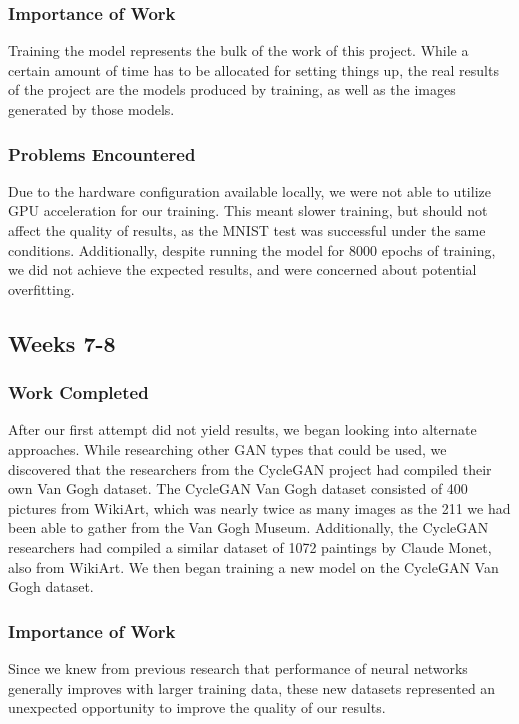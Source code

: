 \documentclass[11pt,letterpaper]{article}
\begin{document}
			\subsubsection{Importance of Work}
				Training the model represents the bulk of the work of this project.
				While a certain amount of time has to be allocated for setting things up, the real results of the project are the models produced by training, as well as the images generated by those models.
			\subsubsection{Problems Encountered}
				Due to the hardware configuration available locally, we were not able to utilize GPU acceleration for our training.
				This meant slower training, but should not affect the quality of results, as the MNIST test was successful under the same conditions.
				Additionally, despite running the model for 8000 epochs of training, we did not achieve the expected results, and were concerned about potential overfitting.

		\subsection{Weeks 7-8}
			\subsubsection{Work Completed}
				After our first attempt did not yield results, we began looking into alternate approaches.
				While researching other GAN types that could be used, we discovered that the researchers from the CycleGAN\cite{CycleGAN2017}\cite{isola2017image} project had compiled their own Van Gogh dataset.
				The CycleGAN Van Gogh dataset consisted of 400 pictures from WikiArt\cite{wikiartVanGogh}, which was nearly twice as many images as the 211 we had been able to gather from the Van Gogh Museum.
				Additionally, the CycleGAN researchers had compiled a similar dataset of 1072 paintings by Claude Monet, also from WikiArt.
				We then began training a new model on the CycleGAN Van Gogh dataset.
			\subsubsection{Importance of Work}
				Since we knew from previous research that performance of neural networks generally improves with larger training data, these new datasets represented an unexpected opportunity to improve the quality of our results.
\end{document}
